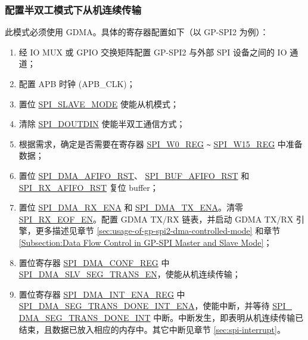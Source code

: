 \documentclass[main\_\_CN.tex]{subfiles}
\begin{document}
\subsubsection{配置半双工模式下从机连续传输}\label{sec:gp-spi2-slave-hd-seg-trans}

此模式必须使用 GDMA。具体的寄存器配置如下（以 GP-SPI2 为例）：

\begin{enumerate}
   \item 经 IO MUX 或 GPIO 交换矩阵配置 GP-SPI2 与外部 SPI 设备之间的 IO 通道；

   \item 配置 APB 时钟 (APB\_CLK)；

    \item 置位  \hyperref[fielddesc:SPISLAVEMODE]{SPI\_SLAVE\_MODE} 使能从机模式；

    \item 清除  \hyperref[fielddesc:SPIDOUTDIN]{SPI\_DOUTDIN} 使能半双工通信方式；

    \item 根据需求，确定是否需要在寄存器  \hyperref[regdesc:SPIW0REG]{SPI\_W0\_REG} \verb+~+ \hyperref[regdesc:SPIW15REG]{SPI\_W15\_REG} 中准备数据；

    \item 置位  \hyperref[fielddesc:SPIDMAAFIFORST]{SPI\_DMA\_AFIFO\_RST}、 \hyperref[fielddesc:SPIBUFAFIFORST]{SPI\_BUF\_AFIFO\_RST} 和  \hyperref[fielddesc:SPIRXAFIFORST]{SPI\_RX\_AFIFO\_RST} 复位 buffer；

    \item 置位  \hyperref[fielddesc:SPIDMARXENA]{SPI\_DMA\_RX\_ENA} 和  \hyperref[fielddesc:SPIDMATXENA]{SPI\_DMA\_TX\_ENA}。清零  \hyperref[fielddesc:SPIRXEOFEN]{SPI\_RX\_EOF\_EN}。配置 GDMA TX/RX 链表，并启动 GDMA TX/RX 引擎，更多描述见章节  \ref{sec:usage-of-gp-spi2-dma-controlled-mode} 和章节  \ref{Subsection:Data Flow Control in GP-SPI Master and Slave Mode}；

    \item 置位寄存器  \hyperref[regdesc:SPIDMACONFREG]{SPI\_DMA\_CONF\_REG} 中 \hyperref[fielddesc:SPIDMASLVSEGTRANSEN]{SPI\_DMA\_SLV\_SEG\_TRANS\_EN}，使能从机连续传输；

    \item 置位寄存器  \hyperref[regdesc:SPIDMAINTENAREG]{SPI\_DMA\_INT\_ENA\_REG} 中 \hyperref[fielddesc:SPIDMASEGTRANSDONEINTENA]{SPI\_DMA\_SEG\_TRANS\_DONE\_INT\_ENA}，使能中断，并等待  \hyperref[int:SPIDMASEGTRANSDONEINT]{SPI\_\\DMA\_SEG\_TRANS\_DONE\_INT} 中断。中断发生，即表明从机连续传输已结束，且数据已放入相应的内存中。其它中断见章节  \ref{sec:spi-interrupt}。
\end{enumerate}
\end{document}

